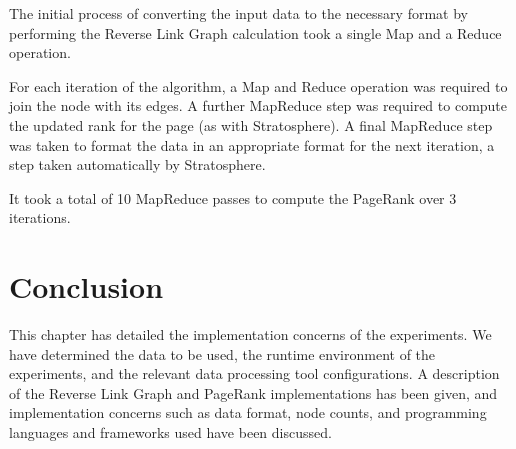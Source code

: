 The initial process of converting the input data to the necessary format by performing the Reverse Link Graph calculation took a single Map and a Reduce operation. 

For each iteration of the algorithm, a Map and Reduce operation was required to join the node with its edges. A further MapReduce step was required to compute the updated rank for the page (as with Stratosphere). A final MapReduce step was taken to format the data in an appropriate format for the next iteration, a step taken automatically by Stratosphere.

It took a total of 10 MapReduce passes to compute the PageRank over 3 iterations.

\section{Conclusion}
This chapter has detailed the implementation concerns of the experiments. We have determined the data to be used, the runtime environment of the experiments, and the relevant data processing tool configurations. A description of the Reverse Link Graph and PageRank implementations has been given, and implementation concerns such as data format, node counts, and programming languages and frameworks used have been discussed.